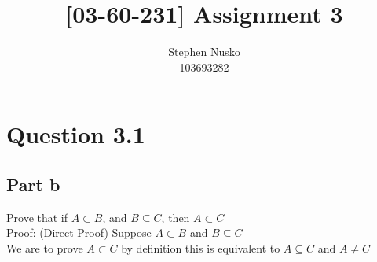 \documentclass{article}
\title{[03-60-231] Assignment 3}
\author{Stephen Nusko \\ 103693282}
\begin{document}
	\thispagestyle{empty}
	\maketitle	
	\section{Question 3.1}
		\subsection{Part b}
			Prove that if $A \subset B$, and $B \subseteq C$, then $A \subset C$ \\
			Proof: (Direct Proof) Suppose $A \subset B$ and $B \subseteq C$ \\
			We are to prove $A \subset C$ by definition this is equivalent to $A \subseteq C$ and $A \neq C$ \\
\end{document}
